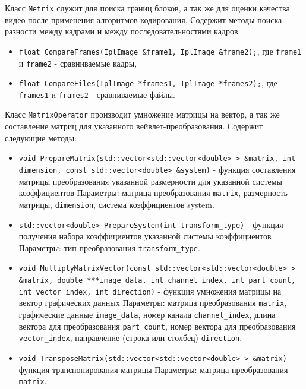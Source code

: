 Класс \texttt{Metrix} служит для поиска границ блоков,
а так же для оценки качества видео после применения алгоритмов кодирования. Содержит методы поиска разности между кадрами и между последовательностями кадров:
\begin{itemize}
 \item \texttt{float CompareFrames(IplImage \&frame1, IplImage \&frame2);}, где \texttt{frame1} и \texttt{frame2} - сравниваемые кадры,
 \item \texttt{float CompareFiles(IplImage *frames1, IplImage *frames2);}, где \texttt{frames1} и \texttt{frames2} - сравниваемые файлы.
\end{itemize}

Класс \texttt{MatrixOperator} производит умножение матрицы на вектор, а так же составление матриц для указанного вейвлет-преобразования. Содержит следующие методы:
\begin{itemize}
 \item \texttt{void PrepareMatrix(std::vector<std::vector<double> > \&matrix, int dimension, const std::vector<double> \&system)} - 
 функция составления матрицы преобразования указанной размерности для указанной системы коэффициентов
 Параметры: матрица преобразования \texttt{matrix}, размерность матрицы, \texttt{dimension}, система коэффициентов system.

 \item \texttt{std::vector<double> PrepareSystem(int transform\_type)} - функция получения набора коэффициентов указанной системы коэффициентов
 Параметры: тип преобразования \texttt{transform\_type}.

 \item \texttt{void MultiplyMatrixVector(const std::vector<std::vector<double> > \&matrix, double ***image\_data, int channel\_index, 
 int part\_count, int vector\_index, int direction)} - функция умножения матрицы на вектор графических данных
 Параметры: матрица преобразования \texttt{matrix}, графические данные \texttt{image\_data}, 
 номер канала \texttt{channel\_index}, длина вектора для преобразования \texttt{part\_count}, 
 номер вектора для преобразования \texttt{vector\_index}, направление (строка или столбец) \texttt{direction}.

 \item \texttt{void TransposeMatrix(std::vector<std::vector<double> > \&matrix)} - функция транспонирования матрицы
 Параметры: матрица преобразования \texttt{matrix}.

\end{itemize}

